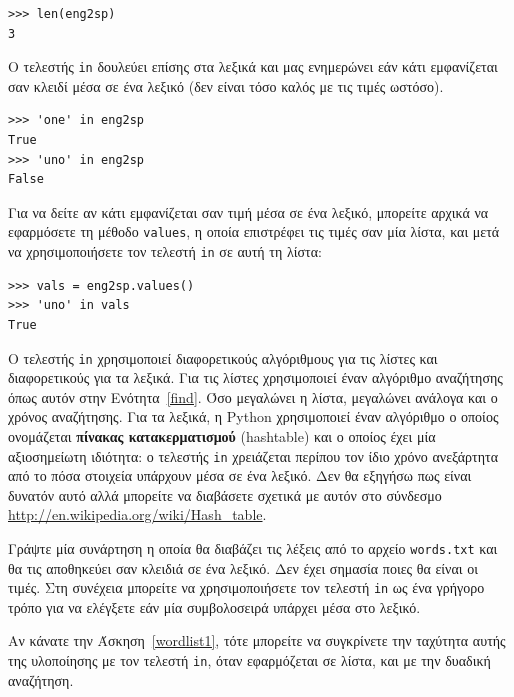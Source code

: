 \documentclass[10pt]{book}
\begin{document}
\begin{verbatim}
>>> len(eng2sp)
3
\end{verbatim}
%
Ο τελεστής {\tt in} δουλεύει επίσης στα λεξικά και μας ενημερώνει εάν κάτι εμφανίζεται σαν κλειδί μέσα σε ένα λεξικό (δεν είναι τόσο καλός με τις τιμές ωστόσο). 

\begin{verbatim}
>>> 'one' in eng2sp
True
>>> 'uno' in eng2sp
False
\end{verbatim}
%
Για να δείτε αν κάτι εμφανίζεται σαν τιμή μέσα σε ένα λεξικό, μπορείτε αρχικά να εφαρμόσετε τη μέθοδο {\tt values}, η οποία επιστρέφει τις τιμές σαν μία λίστα, και μετά να χρησιμοποιήσετε τον τελεστή {\tt in} σε αυτή τη λίστα:

\begin{verbatim}
>>> vals = eng2sp.values()
>>> 'uno' in vals
True
\end{verbatim}
%
Ο τελεστής {\tt in} χρησιμοποιεί διαφορετικούς αλγόριθμους για τις λίστες και διαφορετικούς για τα λεξικά. Για τις λίστες χρησιμοποιεί έναν αλγόριθμο αναζήτησης όπως αυτόν στην Ενότητα~\ref{find}. Όσο μεγαλώνει η λίστα, μεγαλώνει ανάλογα και ο χρόνος αναζήτησης. Για τα λεξικά, η Python χρησιμοποιεί έναν αλγόριθμο ο οποίος ονομάζεται {\bf πίνακας κατακερματισμού} (hashtable) και ο οποίος έχει μία αξιοσημείωτη ιδιότητα: ο τελεστής {\tt in} χρειάζεται περίπου τον ίδιο χρόνο ανεξάρτητα από το πόσα στοιχεία υπάρχουν μέσα σε ένα λεξικό. Δεν θα εξηγήσω πως είναι δυνατόν αυτό αλλά μπορείτε να διαβάσετε σχετικά με αυτόν στο σύνδεσμο \url{http://en.wikipedia.org/wiki/Hash_table}.
\\

\begin{exercise}
\label{wordlist2}

Γράψτε μία συνάρτηση η οποία θα διαβάζει τις λέξεις από το αρχείο {\tt words.txt} και θα τις αποθηκεύει σαν κλειδιά σε ένα λεξικό. Δεν έχει σημασία ποιες θα είναι οι τιμές. Στη συνέχεια μπορείτε να χρησιμοποιήσετε τον τελεστή  
{\tt in} ως ένα γρήγορο τρόπο για να ελέγξετε εάν μία συμβολοσειρά υπάρχει μέσα στο λεξικό.

Αν κάνατε την Άσκηση~\ref{wordlist1}, τότε μπορείτε να συγκρίνετε την ταχύτητα αυτής της υλοποίησης με τον τελεστή {\tt in}, όταν εφαρμόζεται σε λίστα, και με  την δυαδική αναζήτηση.
\end{exercise}
\end{document}
